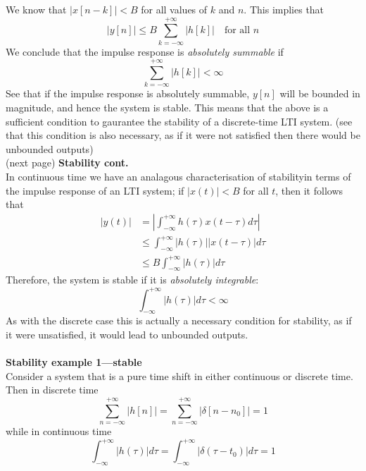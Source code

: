 \documentclass{report}
\begin{document}
We know that $|x[n-k]|<B$ for all values of $k$ and $n$. This implies that
\begin{equation*}
|y[n]|\leq B\sum^{+\infty}_{k=-\infty}|h[k]|\quad\text{for all }n
\end{equation*}
We conclude that the impulse response is \textit{absolutely summable} if
\begin{equation*}
\sum^{+\infty}_{k=-\infty}|h[k]|<\infty
\end{equation*}
See that if the impulse response is absolutely summable, $y[n]$ will be bounded in magnitude, and hence the system is stable. This means
that the above is a sufficient condition to gaurantee the stability of a discrete-time LTI system. (see that this condition 
is also necessary, as if it were not satisfied then there would be unbounded outputs)\\
(next page)\newpage
\noindent\textbf{Stability cont.}\\
In continuous time we have an analagous characterisation of stabilityin terms of the impulse response of an LTI system; 
if $|x(t)|<B$ for all $t$, then it follows that
\begin{align*}
|y(t)|&=\left|\int^{+\infty}_{-\infty}h(\tau)x(t-\tau)d\tau\right|\\
&\leq\int^{+\infty}_{-\infty}|h(\tau)||x(t-\tau)|d\tau\\
&\leq B\int^{+\infty}_{-\infty}|h(\tau)|d\tau
\end{align*}
Therefore, the system is stable if it is \textit{absolutely integrable}:
\begin{equation*}
\int^{+\infty}_{-\infty}|h(\tau)|d\tau<\infty
\end{equation*}
As with the discrete case this is actually a necessary condition for stability, as if it were unsatisfied, it would lead to unbounded 
outputs.\\
\vspace{1mm}\\
\textbf{Stability example 1---stable}\\
Consider a system that is a pure time shift in either continuous or discrete time. Then in discrete time 
\begin{equation*}
\sum^{+\infty}_{n=-\infty}|h[n]|=
\sum^{+\infty}_{n=-\infty}|\delta[n-n_0]|=1
\end{equation*}
while in continuous time
\begin{equation*}
\int^{+\infty}_{-\infty}|h(\tau)|d\tau=
\int^{+\infty}_{-\infty}|\delta(\tau-t_0)|d\tau=1
\end{equation*}
\end{document}
